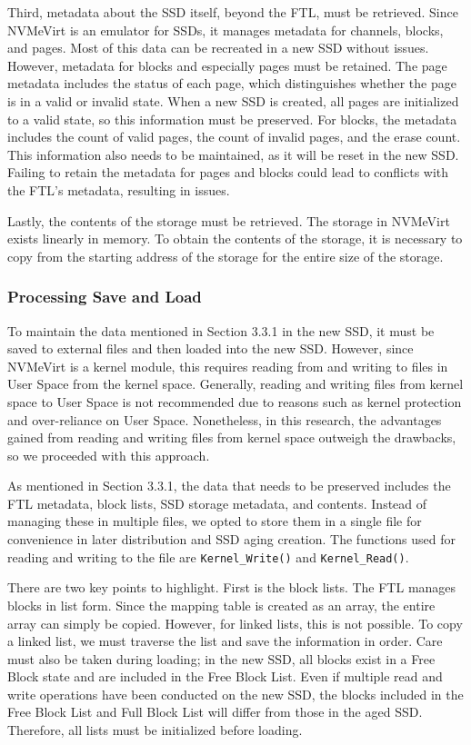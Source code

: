 Third, metadata about the SSD itself, beyond the FTL, must be retrieved.
Since NVMeVirt is an emulator for SSDs, it manages metadata for channels, blocks, and pages.
Most of this data can be recreated in a new SSD without issues.
However, metadata for blocks and especially pages must be retained.
The page metadata includes the status of each page, which distinguishes whether the page is in a valid or invalid state.
When a new SSD is created, all pages are initialized to a valid state, so this information must be preserved.
For blocks, the metadata includes the count of valid pages, the count of invalid pages, and the erase count.
This information also needs to be maintained, as it will be reset in the new SSD.
Failing to retain the metadata for pages and blocks could lead to conflicts with the FTL's metadata, resulting in issues.

Lastly, the contents of the storage must be retrieved.
The storage in NVMeVirt exists linearly in memory.
To obtain the contents of the storage, it is necessary to copy from the starting address of the storage for the entire size of the storage.


\subsubsection{Processing Save and Load}

To maintain the data mentioned in Section 3.3.1 in the new SSD, it must be saved to external files and then loaded into the new SSD.
However, since NVMeVirt is a kernel module, this requires reading from and writing to files in User Space from the kernel space.
Generally, reading and writing files from kernel space to User Space is not recommended due to reasons such as kernel protection and over-reliance on User Space.
Nonetheless, in this research, the advantages gained from reading and writing files from kernel space outweigh the drawbacks, so we proceeded with this approach.


As mentioned in Section 3.3.1, the data that needs to be preserved includes the FTL metadata, block lists, SSD storage metadata, and contents.
Instead of managing these in multiple files, we opted to store them in a single file for convenience in later distribution and SSD aging creation.
The functions used for reading and writing to the file are \texttt{Kernel\_Write()} and \texttt{Kernel\_Read()}.

There are two key points to highlight.
First is the block lists.
The FTL manages blocks in list form.
Since the mapping table is created as an array, the entire array can simply be copied.
However, for linked lists, this is not possible.
To copy a linked list, we must traverse the list and save the information in order.
Care must also be taken during loading; in the new SSD, all blocks exist in a Free Block state and are included in the Free Block List.
Even if multiple read and write operations have been conducted on the new SSD, the blocks included in the Free Block List and Full Block List will differ from those in the aged SSD.
Therefore, all lists must be initialized before loading.

